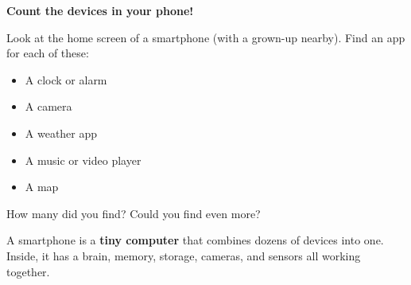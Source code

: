 \sectionrule

\begin{tryit}
  \textbf{Count the devices in your phone!}

  Look at the home screen of a smartphone (with a grown-up nearby).
  Find an app for each of these:
  \begin{itemize}
    \item A clock or alarm
    \item A camera
    \item A weather app
    \item A music or video player
    \item A map
  \end{itemize}
  How many did you find? Could you find even more?
\end{tryit}

\sectionrule

\begin{bigidea}
  A smartphone is a \textbf{tiny computer} that combines dozens of devices
  into one. Inside, it has a brain, memory, storage, cameras, and sensors
  all working together.
\end{bigidea}

